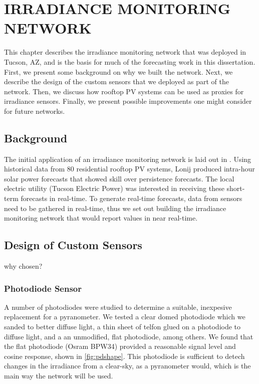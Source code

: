 \chapter{IRRADIANCE MONITORING NETWORK}
\label{chap:sens_net}

This chapter describes the irradiance monitoring network that was
deployed in Tucson, AZ, and is the basis for much of the forecasting
work in this dissertation.
First, we present some background on why we built the network.
Next, we describe the design of the custom sensors that we deployed as
part of the network.
Then, we discuss how rooftop PV systems can be used as proxies for
irradiance sensors.
Finally, we present possible improvements one might consider for
future networks.

\section{Background}

The initial application of an irradiance monitoring network is laid
out in \cite{Lonij2013}.
Using historical data from 80 residential rooftop PV systems, Lonij
\etal produced intra-hour solar power forecasts that showed skill over
persistence forecasts.
The local electric utility (Tucson Electric Power) was interested in
receiving these short-term forecasts in real-time.
To generate real-time forecasts, data from sensors need to be gathered
in real-time, thus we set out building the irradiance monitoring
network that would report values in near real-time.

\section{Design of Custom Sensors}

why chosen?


\subsection{Photodiode Sensor}
\label{sec:photodiode}
A number of photodiodes were studied to determine a suitable,
inexpesive replacement for a pyranometer.
We tested a clear domed photodiode which we sanded to better diffuse
light, a thin sheet of telfon glued on a photodiode to diffuse light,
and a an unmodified, flat photodiode, among others.
We found that the flat photodiode (Osram BPW34) provided a reasonable
signal level and cosine response, shown in \cref{fig:pdshape}.
This photodiode is sufficient to detech changes in the irradiance from
a clear-sky, as a pyranometer would, which is the main way the network
will be used.


